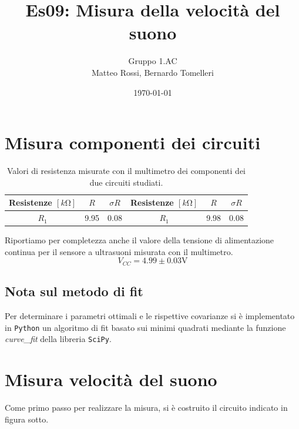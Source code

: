 \documentclass[10pt, a4paper, italian]{article}
\author{Gruppo 1.AC \\ Matteo Rossi, Bernardo Tomelleri}
\title{Es09: Misura della velocità del suono}
\begin{document}
\date{\today}
\maketitle

\setcounter{section}{0}

\section*{Misura componenti dei circuiti}
\begin{table}[htbp]
\centering
\begin{tabular}{ccc|ccc}
\toprule
Resistenze $[\si{k\ohm}]$ & $R$ & $\sigma R$ & Resistenze $[\si{k\ohm}]$ & $R$ &
$\sigma R$ \\
\midrule
\midrule
$R_1$	  	& 9.95 	& 0.08		& $R_1$ & 9.98	& 0.08 \\
\bottomrule
\end{tabular}
\caption{Valori di resistenza misurate con il multimetro dei componenti dei
due circuiti studiati. \label{tab: rcmes_B}}
\end{table}

Riportiamo per completezza anche il valore della tensione di alimentazione
continua per il sensore a ultrasuoni misurata con il multimetro.
\[
V_{CC} = 4.99 \pm 0.03 \si{\V}
\]

\subsection*{Nota sul metodo di fit}
Per determinare i parametri ottimali e le rispettive covarianze si \`e
implementato in \verb+Python+ un algoritmo di fit basato sui minimi quadrati
mediante la funzione \emph{curve\_fit} della libreria \texttt{SciPy}.

\section{Misura velocità del suono}
Come primo passo per realizzare la misura, si è costruito il circuito indicato in figura sotto.
\end{document}
